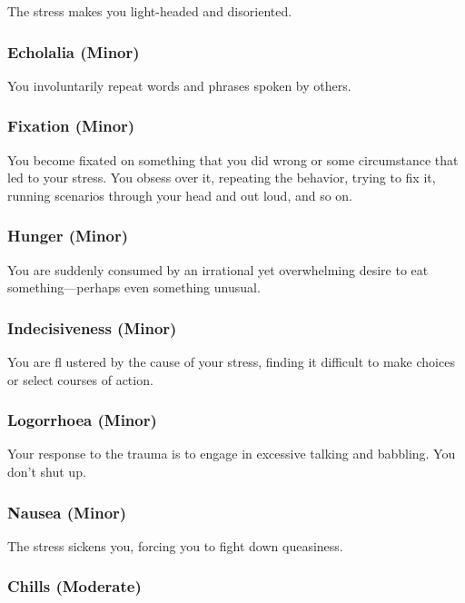 The stress makes you light-headed and disoriented.

\subsubsection{Echolalia (Minor)}

You involuntarily repeat words and phrases spoken 
by others.

\subsubsection{Fixation (Minor)}

You become fixated on something that you did wrong 
or some circumstance that led to your stress. You 
obsess over it, repeating the behavior, trying to fix it, 
running scenarios through your head and out loud, 
and so on.

\subsubsection{Hunger (Minor)}

You are suddenly consumed by an irrational yet 
overwhelming desire to eat something—perhaps even 
something unusual.

\subsubsection{Indecisiveness (Minor)}

You are fl ustered by the cause of your stress, finding it 
difficult to make choices or select courses of action.

\subsubsection{Logorrhoea (Minor)}

Your response to the trauma is to engage in excessive 
talking and babbling. You don't shut up.

\subsubsection{Nausea (Minor)}

The stress sickens you, forcing you to fight  down 
queasiness.

\subsubsection{Chills (Moderate)}

